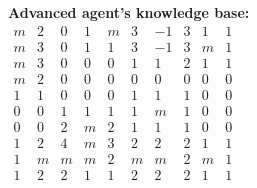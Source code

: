 \documentclass[11pt]{article} %
\begin{document}
\begin{center}
\textbf{Advanced agent's knowledge base:}\\
$\begin{matrix}
m & 2 & 0 & 1 & m & 3 & -1 & 3 & 1 & 1\\
m & 3 & 0 & 1 & 1 & 3 & -1 & 3 & m & 1\\
m & 3 & 0 & 0 & 0 & 1 & 1 & 2 & 1 & 1\\
m & 2 & 0 & 0 & 0 & 0 & 0 & 0 & 0 & 0\\
1 & 1 & 0 & 0 & 0 & 1 & 1 & 1 & 0 & 0\\
0 & 0 & 1 & 1 & 1 & 1 & m & 1 & 0 & 0\\
0 & 0 & 2 & m & 2 & 1 & 1 & 1 & 0 & 0\\
1 & 2 & 4 & m & 3 & 2 & 2 & 2 & 1 & 1\\
1 & m & m & m & 2 & m & m & 2 & m & 1\\
1 & 2 & 2 & 1 & 1 & 2 & 2 & 2 & 1 & 1
\end{matrix}$
\end{center}
\end{document}
